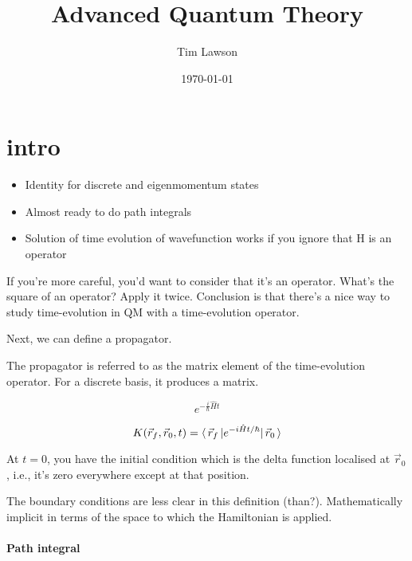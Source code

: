 \documentclass[a4paper]{extarticle}
\title{Advanced Quantum Theory}
\author{Tim Lawson}
\date{\today}
\begin{document}
\maketitle

\tableofcontents

\section{intro}

\begin{itemize}
  \item Identity for discrete and eigenmomentum states
  \item Almost ready to do path integrals
  \item Solution of time evolution of wavefunction works if you ignore that H is an operator
\end{itemize}

If you're more careful, you'd want to consider that it's an operator.
What's the square of an operator? Apply it twice.
Conclusion is that there's a nice way to study time-evolution in QM with a time-evolution operator.

Next, we can define a propagator.

The propagator is referred to as the matrix element of the time-evolution operator.
For a discrete basis, it produces a matrix.

\begin{dfn}
  \begin{equation}
    e^{-\frac{i}{\hbar} \hat{H} t}
  \end{equation}
\end{dfn}

\begin{dfn}
  [Propagator]
  \begin{equation}
    K(\vec{r}_f, \vec{r}_0, t) = \langle\,\vec{r}_f\,\rvert e^{-i \hat{H} t / \hbar} \lvert\,\vec{r}_0\,\rangle
  \end{equation}
\end{dfn}

At $t = 0$, you have the initial condition which is the delta function localised
at $\vec{r}_0$, i.e., it's zero everywhere except at that position.

The boundary conditions are less clear in this definition (than?).
Mathematically implicit in terms of the space to which the Hamiltonian is applied.

\paragraph{Path integral}
\end{document}
